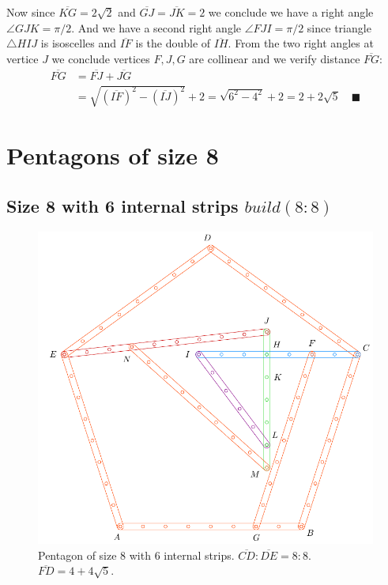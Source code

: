 \documentclass[11pt]{article}
\begin{document}
Now since $\overline{KG} = 2\sqrt2$ and $\overline{GJ} = \overline{JK} = 2$ we conclude we have a right angle $\angle{GJK} = \pi / 2.$ And we have a second right angle $\angle{FJI} = \pi/2$ since triangle $\triangle{HIJ}$ is isoscelles and $\overline{IF}$ is the double of $\overline{IH}$. From the two right angles at vertice $J$ we conclude vertices $F,J,G$ are collinear and we verify distance $\overline{FG}$:
\begin{align}
\overline{FG} &= \overline{FJ} + \overline{JG} \nonumber\\
 &= \sqrt{(\overline{IF})^2 - (\overline{IJ})^2} + 2
 = \sqrt{6^2 - 4^2} + 2 = 2 + 2\sqrt5 \quad \blacksquare
\end{align}


\section{Pentagons of size 8}

\subsection{Size 8 with 6 internal strips $build(8:8)$}

\begin{figure}[H]
\centering
\includegraphics[scale=0.8]{8/penta8-6a}
\caption{Pentagon of size 8 with 6 internal strips. $\overline{CD} : \overline{DE} = 8:8$. $\overline{FD} = 4 + 4\sqrt5$.}
\label{fig:penta8-6a}
\end{figure}
\end{document}
